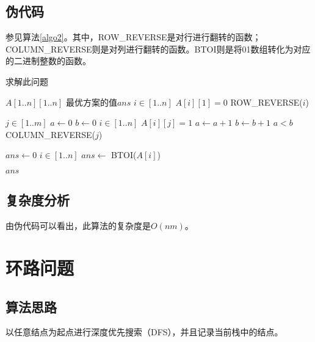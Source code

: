 \documentclass[UTF8]{ctexart}
\begin{document}
    \subsection*{伪代码}
    参见算法\ref{algo2}。其中，ROW\_REVERSE是对行进行翻转的函数；COLUMN\_REVERSE则是对列进行翻转的函数。BTOI则是将01数组转化为对应的二进制整数的函数。
        \begin{algorithm}
            \caption{求解此问题}
            \begin{algorithmic}[1]
                \Require $A[1..n][1..n]$
                \Ensure 最优方案的值$ans$
                    \For $i \in [1..n]$
                        \If $A[i][1] = 0$
                            \State ROW\_REVERSE($i$)
                        \EndIf
                    \EndFor

                    \For $j \in [1..m]$
                        \State $a \gets 0$
                        \State $b \gets 0$
                        \For $i \in [1..n]$
                            \If $A[i][j] = 1$
                                \State $a \gets a+1$
                            \Else
                                \State $b \gets b+1$
                            \EndIf
                        \EndFor
                        \If $a < b$
                            \State COLUMN\_REVERSE($j$)
                        \EndIf
                    \EndFor

                    \State $ans \gets 0$
                    \For $i \in [1..n]$
                        \State $ans \gets$ BTOI($A[i]$)
                    \EndFor

                    \State \Return $ans$
                \EndFunction
            \end{algorithmic}
            \label{algo2}
        \end{algorithm}

    \subsection*{复杂度分析}
    由伪代码可以看出，此算法的复杂度是$O(nm)$。

\section{环路问题} %
    \subsection*{算法思路}
        以任意结点为起点进行深度优先搜索（DFS），并且记录当前栈中的结点。
\end{document}
